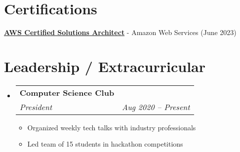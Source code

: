 \documentclass[letterpaper,11pt]{article}
\makeatletter
\newcommand{\resumeItem}[1]{
  \item\small{
    {#1 \vspace{-2pt}}
  }
}
\newcommand{\resumeSubheading}[4]{
  \vspace{-2pt}\item
    \begin{tabular*}{1.0\textwidth}[t]{l@{\extracolsep{\fill}}r}
      \textbf{#1} & \textbf{\small #2} \\
      \textit{\small#3} & \textit{\small #4} \\
    \end{tabular*}\vspace{-7pt}
}
\newcommand{\resumeSubHeadingListStart}{\begin{itemize}[leftmargin=0.0in, label={}]}
\newcommand{\resumeSubHeadingListEnd}{\end{itemize}}
\newcommand{\resumeItemListStart}{\begin{itemize}}
\newcommand{\resumeItemListEnd}{\end{itemize}\vspace{-5pt}}
\makeatother
\begin{document}
\section{Certifications}
 \begin{itemize}[leftmargin=0.15in, label={}]
    \small{\item{
     \textbf{\href{https://aws.amazon.com/certification/}{AWS Certified Solutions Architect}} - Amazon Web Services (June 2023) \\
    }}
 \end{itemize}
 \vspace{-16pt}


\section{Leadership / Extracurricular}
    \resumeSubHeadingListStart
      \resumeSubheading
        {Computer Science Club}{}
        {President}{Aug 2020 -- Present}
        \resumeItemListStart
          \resumeItem{Organized weekly tech talks with industry professionals}
          \resumeItem{Led team of 15 students in hackathon competitions}
        \resumeItemListEnd
    \resumeSubHeadingListEnd
\end{document}
